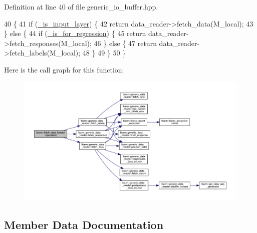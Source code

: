 Definition at line 40 of file generic\+\_\+io\+\_\+buffer.\+hpp.


\begin{DoxyCode}
40                                                                         \{
41     \textcolor{keywordflow}{if} (\hyperlink{classlbann_1_1fetch__data__functor_a8cc5a064d51a0a42e5a43c82ba576e67}{\_is\_input\_layer}) \{
42       \textcolor{keywordflow}{return} data\_reader->fetch\_data(M\_local);
43     \} \textcolor{keywordflow}{else} \{
44       \textcolor{keywordflow}{if} (\hyperlink{classlbann_1_1fetch__data__functor_a8946419e8dc9374216f8aa6bbc365b14}{\_is\_for\_regression}) \{
45         \textcolor{keywordflow}{return} data\_reader->fetch\_responses(M\_local);
46       \} \textcolor{keywordflow}{else} \{
47         \textcolor{keywordflow}{return} data\_reader->fetch\_labels(M\_local);
48       \}
49     \}
50   \}
\end{DoxyCode}
Here is the call graph for this function\+:\nopagebreak
\begin{figure}[H]
\begin{center}
\leavevmode
\includegraphics[width=350pt]{classlbann_1_1fetch__data__functor_ae1320d9ad90983b03bbabac9bb6d0748_cgraph}
\end{center}
\end{figure}


\subsection{Member Data Documentation}
\mbox{\label{classlbann_1_1fetch__data__functor_a8946419e8dc9374216f8aa6bbc365b14}} 

